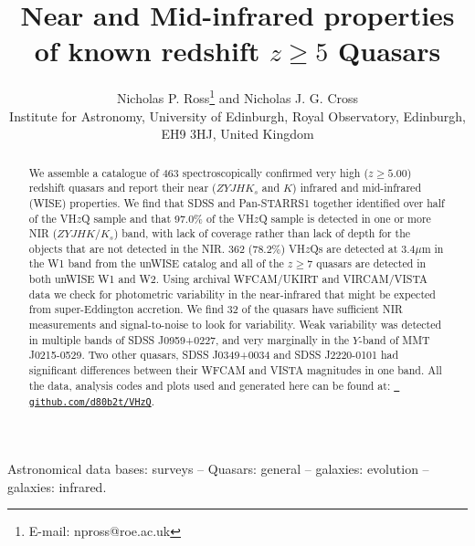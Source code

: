 \documentclass[usenatbib]{mnras}
\begin{document}
\title[Infrared properties Very high-$z$ Quasars]
  {Near and Mid-infrared properties of known redshift $z\geq5$ Quasars}
\author[Ross \& Cross]
{Nicholas P. Ross\thanks{E-mail: npross@roe.ac.uk} and Nicholas J. G. Cross \\ 
Institute for Astronomy, University of Edinburgh, Royal Observatory, Edinburgh, EH9 3HJ, United Kingdom\\ }

\maketitle
\begin{abstract}
We assemble a catalogue of 463 spectroscopically confirmed very high ($z\geq5.00$) redshift quasars and report their near ($ZYJHK_{s}$ and $K$) infrared and mid-infrared (WISE) properties. We find that SDSS and Pan-STARRS1 together identified over half of the VH$z$Q sample and that 97.0\% of the VH$z$Q sample is detected in one or more NIR ($ZYJHK/K_{s}$) band, with lack of coverage rather than lack of depth for the objects that are not detected in the NIR. 362 (78.2\%) VH$z$Qs are detected at 3.4$\mu$m in the W1 band from the unWISE catalog and all of the $z\geq7$ quasars are detected in both unWISE W1 and W2. Using archival WFCAM/UKIRT and VIRCAM/VISTA data we check for photometric variability in the near-infrared that might be expected from super-Eddington accretion. We find 32 of the quasars have sufficient NIR measurements and signal-to-noise to look for variability. Weak variability was detected in multiple bands of SDSS J0959+0227, and very marginally in the $Y$-band of MMT J0215-0529. Two other quasars, SDSS J0349+0034 and SDSS J2220-0101 had significant differences between their WFCAM and VISTA magnitudes in one band. 
All the data, analysis codes and plots used and generated here can be
found at: \href{https://github.com/d80b2t/VHzQ}{\tt
github.com/d80b2t/VHzQ}.
\end{abstract}


\begin{keywords}
Astronomical data bases: surveys -- 
Quasars: general -- 
galaxies: evolution -- 
galaxies: infrared.
\end{keywords}
\end{document}
